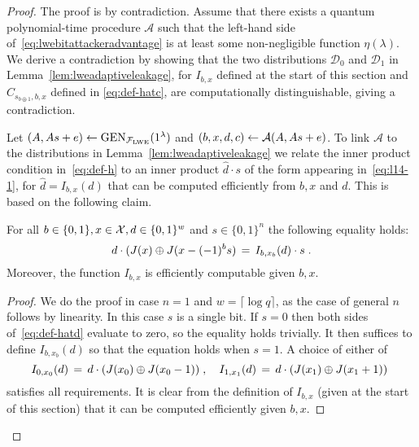 \begin{proof}
The proof is by contradiction. Assume that there exists a quantum polynomial-time procedure $\mathcal{A}$ such that the left-hand side of~\eqref{eq:lwebitattackeradvantage} is at least some non-negligible function $\eta(\lambda)$. We derive a contradiction by showing that the two distributions $\mathcal{D}_0$ and $\mathcal{D}_1$ in Lemma~\ref{lem:lweadaptiveleakage}, for $I_{b,x}$ defined at the start of this section and $\hat{C}_{s_{b\oplus 1},b,x}$ defined in \eqref{eq:def-hatc}, are computationally distinguishable, giving a contradiction. 

Let $(\*A,\*A\*s+\*e) \leftarrow \textrm{GEN}_{\mathcal{F}_{\lwe}}(1^{\lambda})$ and $(b,x,d,c) \leftarrow \mathcal{A}(\*A,\*A\*s+\*e)$. To link $\mathcal{A}$ to the distributions in Lemma~\ref{lem:lweadaptiveleakage} we relate the inner product condition in~\eqref{eq:def-h} to an inner product $\hat{d} \cdot s$ of the form appearing in~\eqref{eq:l14-1}, for $\hat{d} = I_{b,x}(d)$ that can be computed efficiently from $b,x$ and $d$. This is based on the following claim. 

\iffalse
\begin{claim}\label{cl:dependenceonsecret}
Let $x_0,x_1\in \sX$ be such that $x_{1} = x_0 -  \*s$ for some $s \in \{0,1\}^n$. Then for any $b\in\{0,1\}$ and $d \in \{0,1\}^{w}$ the following equality holds:
\begin{equation}\label{eq:def-hatd}
d\cdot(\inj(x_0)\oplus \inj(x_1)) \,=\,  I_{b,x}(d)\cdot s \;.
\end{equation}
Moreover, the function $I_{b,x}$ is efficiently computable (given $b,x$), and $I_{b,x}(d)\neq 0^n$ whenever $d\in \hat{C}_{s,b,x}$, the set defined in~\eqref{eq:def-hatc}. 
\end{claim}
\fi

\begin{claim}\label{cl:dependenceonsecret}
For all $b\in\{0,1\},x\in \mathcal{X}, d\in\{0,1\}^w$ and $s\in\{0,1\}^n$ the following equality holds:
\begin{equation}\label{eq:def-hatd}
d\cdot(\inj(x)\oplus \inj( x - (-1)^b \*s ) \,=\,  I_{b,x_b}(d)\cdot s \;.
\end{equation}
Moreover, the function $I_{b,x}$ is efficiently computable given $b,x$. 
\end{claim}

\begin{proof}
We do the proof in case $n=1$ and $w=\lceil\log q\rceil$, as the case of general $n$ follows by linearity. In this case $s$ is a single bit. If $s=0$ then both sides of~\eqref{eq:def-hatd} evaluate to zero, so the equality holds trivially. It then suffices to define $ I_{b,x_b}(d)$ so that the equation holds when $s=1$. A choice of either of
\begin{equation}\label{eq:def-hatd-1}
I_{0,x_0}(d)\,=\, d \cdot (\inj(x_0) \oplus \inj(x_0 -\*1))\;,\quad  I_{1,x_1}(d)\,=\,d \cdot (\inj(x_1) \oplus \inj(x_1 +\*1 ))\;
\end{equation}
satisfies all requirements. It is clear from the definition of $I_{b,x}$ (given at the start of this section) that it can be computed efficiently given $b,x$.  
\end{proof}


\end{proof}
